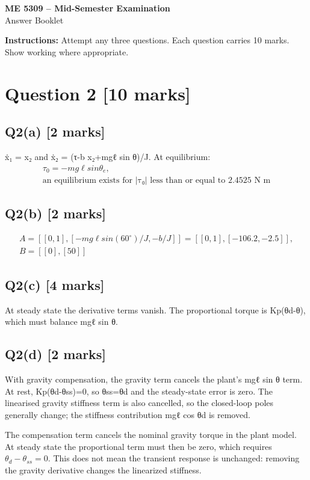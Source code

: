 \documentclass[11pt,a4paper]{article}
\begin{document}
\begin{center}
{\Large\bfseries ME 5309 -- Mid-Semester Examination}\\[3pt]
{\large Answer Booklet}\\[8pt]
\end{center}
\textbf{Instructions:} Attempt any three questions. Each question carries 10 marks. Show working where appropriate.
\section*{Question 2 \hfill [10 marks]}
\subsection*{Q2(a) \hfill [2 marks]}

ẋ₁ = x₂ and ẋ₂ = (τ-b x₂+mgℓ sin θ)/J.
At equilibrium:\[\begin{aligned}τ_0 = -mg\ell sin \theta_e,\\ \text{an equilibrium exists for |τ₀| less than or equal to 2.4525 N m}\end{aligned}\]

\subsection*{Q2(b) \hfill [2 marks]}

\[\begin{aligned}A = [[0,1], [-mg\ell sin(60^{\circ})/J, -b/J]] = [[0,1], [-106.2, -2.5]],\\ B = [[0],[50]]\end{aligned}\]

\subsection*{Q2(c) \hfill [4 marks]}

At steady state the derivative terms vanish.
The proportional torque is Kp(θd-θ), which must balance mgℓ sin θ.

\subsection*{Q2(d) \hfill [2 marks]}

With gravity compensation, the gravity term cancels the plant's mgℓ sin θ term.
At rest, Kp(θd-θss)=0, so θss=θd and the steady-state error is zero.
The linearised gravity stiffness term is also cancelled, so the closed-loop poles generally change; the stiffness contribution mgℓ cos θd is removed.\par\smallskip The compensation term cancels the nominal gravity torque in the plant model. At steady state the proportional term must then be zero, which requires $\theta_d-\theta_{ss}=0$. This does not mean the transient response is unchanged: removing the gravity derivative changes the linearized stiffness.
\end{document}
